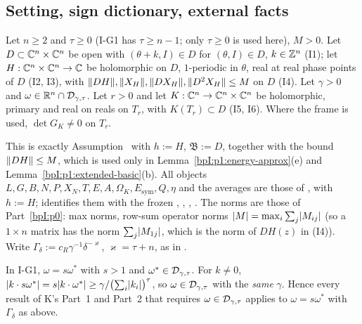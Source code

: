 \subsection{Setting, sign dictionary, external facts}\label{bpI:p1:sec-setting}

\begin{assumption}\label{bpI:p1:setting}
Let $n\ge2$ and $\tau\ge0$ (I-G1 has $\tau\ge n-1$; only $\tau\ge0$ is used here), $M>0$. Let
$D\subset\mathbb{C}^n\times\mathbb{C}^n$ be open with $(\theta+k,I)\in D$ for $(\theta,I)\in D$, $k\in\mathbb{Z}^n$ (I1); let
$H:\mathbb{C}^n\times\mathbb{C}^n\to\mathbb{C}$ be holomorphic on $D$, $1$-periodic in $\theta$, real at real phase points of $D$
(I2, I3), with $\lVert DH\rVert,\lVert X_H\rVert,\lVert DX_H\rVert,\lVert D^2X_H\rVert\le M$ on $D$ (I4). Let $\gamma>0$ and
$\omega\in\mathbb{R}^n\cap\mathcal{D}_{\gamma,\tau}$. Let $r>0$ and let $K:\mathbb{C}^n\to\mathbb{C}^n\times\mathbb{C}^n$ be holomorphic, primary and real
on reals on $T_r$, with $K(T_r)\subset D$ (I5, I6). Where the frame is used, $\det G_K\ne0$ on $T_r$.
\end{assumption}

This is exactly Assumption~ with $h:=H$, $\mathfrak B:=D$, together with the bound
$\lVert DH\rVert\le M$, which is used only in Lemma~\ref{bpI:p1:energy-approx}(e) and
Lemma~\ref{bpI:p1:extended-basic}(b). All objects $L,G,B,N,P,X_N,T,E,A,\Omega_K,E_{\mathrm{sym}},Q,\eta$ and the
averages are those of , with $h:=H$;  identifies them with the
frozen , , , . The norms are those of
Part~\ref{bpI:p0}: max norms, row-sum operator norms $\lvert M\rvert=\max_i\sum_j\lvert M_{ij}\rvert$ (so a $1\times n$ matrix has
the norm $\sum_j\lvert M_{1j}\rvert$, which is the norm of $DH(z)$ in (I4)). Write $\Gamma_\delta:=c_R\gamma^{-1}\delta^{-\varkappa}$,
$\varkappa=\tau+n$, as in .

\begin{remark}\label{bpI:p1:ray}
In I-G1, $\omega=s\omega^*$ with $s>1$ and $\omega^*\in\mathcal{D}_{\gamma,\tau}$. For $k\ne0$,
$\lvert k\cdot s\omega^*\rvert=s\lvert k\cdot\omega^*\rvert\ge\gamma/\bigl(\sum_i\lvert k_i\rvert\bigr)^\tau$, so
$\omega\in\mathcal{D}_{\gamma,\tau}$ with the \emph{same} $\gamma$. Hence every result of K's Part~1 and Part~2 that
requires $\omega\in\mathcal{D}_{\gamma,\tau}$ applies to $\omega=s\omega^*$ with $\Gamma_\delta$ as above.
\end{remark}

